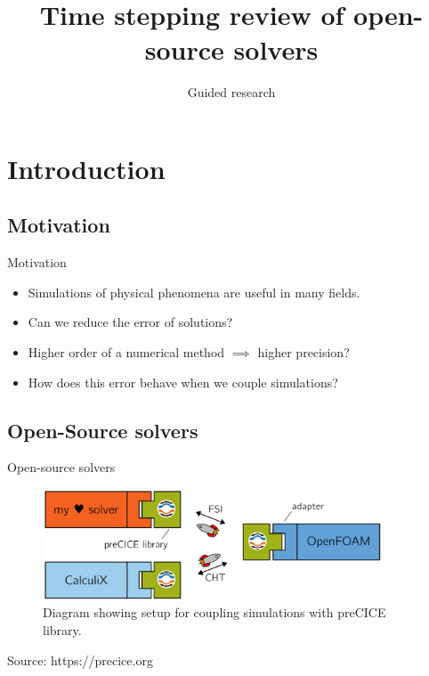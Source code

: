 \documentclass[
  english,            %
  aspectratio=43,    %
]{tumbeamer}
\title{Time stepping review of open-source solvers}
\subtitle{Guided research}
\author{\theAuthorName}
\date{
    \small

\textbf{Supervisor:} Prof. Dr. Hans-Joachim Bungartz \\
\textbf{Advisor:} M.Sc. Benjamin Rodenberg \\
}
\begin{document}
\maketitle

\section{Introduction}

\subsection{Motivation}
\begin{frame}{Motivation}
    \vspace*{\fill}
    \begin{itemize}
        \large
        \setlength\itemsep{20pt}
        \item Simulations of physical phenomena are useful in many fields.
        \pause
        \item Can we reduce the error of solutions?
        \pause
        \item Higher order of a numerical method $\implies$ higher precision?
        \pause
        \item How does this error behave when we couple simulations?
    \end{itemize}
    \vspace*{\fill}
\end{frame}

\subsection{Open-Source solvers}
\begin{frame}{Open-source solvers}
    \vspace{35pt}
    \begin{figure}
        \centering
        \includegraphics[width=0.9\textwidth]{resources/preCICE_graphic.png}
        \caption{Diagram showing setup for coupling simulations with preCICE library.}
        \label{fig:open-source}
    \end{figure}
    \small
    \vspace{20pt}
    \hspace{210pt} Source: https://precice.org
\end{frame}
\end{document}
